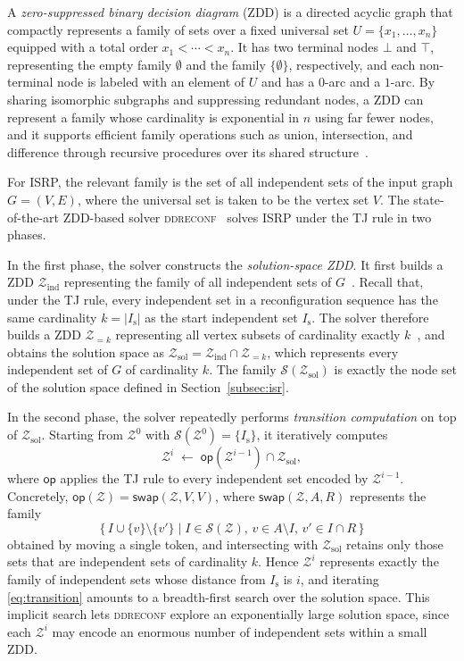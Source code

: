 \documentclass[conference]{IEEEtran}
\newcommand{\ini}{\mathrm{s}}
\newcommand{\Z}{\mathcal{Z}}
\newcommand{\sets}{\mathcal{S}}
\newcommand{\zind}{\mathcal{Z}_{\mathrm{ind}}}
\newcommand{\zsol}{\mathcal{Z}_{\mathrm{sol}}}
\newcommand{\swap}{\mathsf{swap}}
\begin{document}
A \emph{zero-suppressed binary decision diagram} (ZDD) is a directed acyclic
graph that compactly represents a family of sets over a fixed universal set
$U = \{x_1, \dots, x_n\}$ equipped with a total order $x_1 < \cdots < x_n$.
It has two terminal nodes $\bot$ and $\top$, representing the empty family
$\emptyset$ and the family $\{\emptyset\}$, respectively, and each non-terminal
node is labeled with an element of $U$ and has a $0$-arc and a $1$-arc.
By sharing isomorphic subgraphs and suppressing redundant nodes, a ZDD can
represent a family whose cardinality is exponential in $n$ using far fewer
nodes, and it supports efficient family operations such as union,
intersection, and difference through recursive procedures over its shared
structure~\cite{Minato1993,knuth:taocp41}.

For ISRP, the relevant family is the set of all independent sets of the input
graph $G = (V, E)$, where the universal set is taken to be the vertex set $V$.
The state-of-the-art ZDD-based solver \textsc{ddreconf}~\cite{ItoKNSSTT23} solves
ISRP under the TJ rule in two phases.

In the first phase, the solver constructs the \emph{solution-space ZDD}.
It first builds a ZDD $\zind$ representing the family of all independent sets of
$G$~\cite{Hayase1995}. Recall that, under the TJ rule, every independent set in a
reconfiguration sequence has the same cardinality $k = |I_\ini|$ as the start
independent set $I_\ini$. The solver therefore builds a ZDD $\Z_{=k}$
representing all vertex subsets of cardinality exactly $k$~\cite{knuth:taocp41},
and obtains the solution space as $\zsol = \zind \cap \Z_{=k}$, which represents
every independent set of $G$ of cardinality $k$. The family $\sets(\zsol)$ is
exactly the node set of the solution space defined in
Section~\ref{subsec:isr}.

In the second phase, the solver repeatedly performs \emph{transition
computation} on top of $\zsol$. Starting from $\Z^{0}$ with
$\sets(\Z^{0}) = \{I_\ini\}$, it iteratively computes
\begin{equation}
  \Z^{i} \;\gets\; \mathsf{op}(\Z^{i-1}) \cap \zsol,
  \label{eq:transition}
\end{equation}
where $\mathsf{op}$ applies the TJ rule to every independent set encoded by
$\Z^{i-1}$. Concretely, $\mathsf{op}(\Z) = \swap(\Z, V, V)$, where
$\swap(\Z, A, R)$ represents the family
\[
  \{\, I \cup \{v\} \setminus \{v'\} \mid I \in \sets(\Z),\,
  v \in A \setminus I,\, v' \in I \cap R \,\}
\]
obtained by moving a single token, and intersecting with $\zsol$ retains only
those sets that are independent sets of cardinality $k$. Hence $\Z^{i}$
represents exactly the family of independent sets whose distance from $I_\ini$ is
$i$, and iterating \eqref{eq:transition} amounts to a breadth-first search over
the solution space. This implicit search lets \textsc{ddreconf} explore an
exponentially large solution space, since each $\Z^{i}$ may encode an enormous
number of independent sets within a small ZDD.
\end{document}
